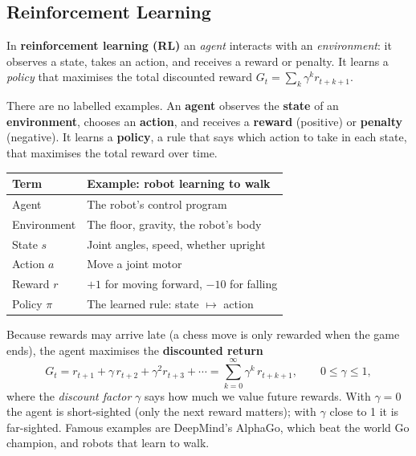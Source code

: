 \subsection{Reinforcement Learning}


\begin{definition}
In \textbf{reinforcement learning (RL)} an \emph{agent} interacts with an \emph{environment}: it observes a state, takes an action, and receives a reward or penalty. It learns a \emph{policy} that maximises the total discounted reward $G_t=\sum_k\gamma^k r_{t+k+1}$.
\end{definition}


There are no labelled examples. An \textbf{agent} observes the \textbf{state} of an \textbf{environment}, chooses an \textbf{action}, and receives a \textbf{reward} (positive) or \textbf{penalty} (negative). It learns a \textbf{policy}, a rule that says which action to take in each state, that maximises the total reward over time.

\begin{center}
\begin{tabular}{@{}ll@{}}
\toprule
\textbf{Term} & \textbf{Example: robot learning to walk}\\
\midrule
Agent & The robot's control program\\
Environment & The floor, gravity, the robot's body\\
State $s$ & Joint angles, speed, whether upright\\
Action $a$ & Move a joint motor\\
Reward $r$ & $+1$ for moving forward, $-10$ for falling\\
Policy $\pi$ & The learned rule: state $\mapsto$ action\\
\bottomrule
\end{tabular}
\end{center}

Because rewards may arrive late (a chess move is only rewarded when the game ends), the agent maximises the \textbf{discounted return}
\[
  G_t = r_{t+1} + \gamma\, r_{t+2} + \gamma^2 r_{t+3} + \cdots = \sum_{k=0}^{\infty}\gamma^{k}\, r_{t+k+1},\qquad 0\le\gamma\le 1,
\]
where the \emph{discount factor} $\gamma$ says how much we value future rewards. With $\gamma=0$ the agent is short-sighted (only the next reward matters); with $\gamma$ close to 1 it is far-sighted. Famous examples are DeepMind's AlphaGo, which beat the world Go champion, and robots that learn to walk.

